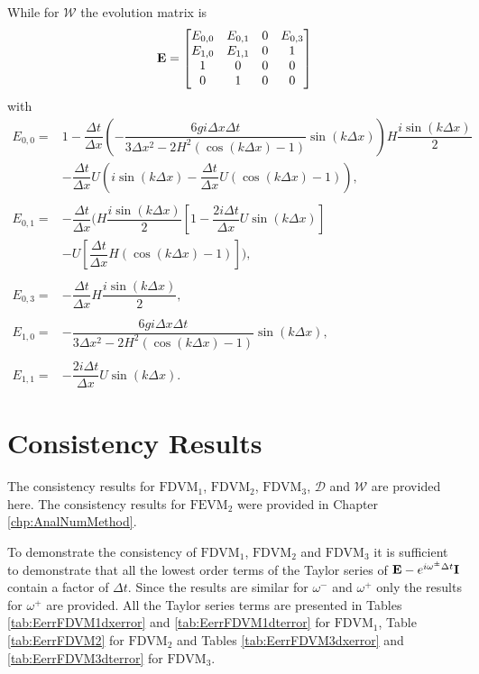 While for $\mathcal{W}$ the evolution matrix is 
\begin{equation}
\label{eqn:AppEvolW}
\mathbf{E} = \begin{bmatrix}
{E}_{0,0} & {E}_{0,1} & 0 & E_{0,3} \\
{E}_{1,0} & E_{1,1} &0 & 1 \\
1&0&0&0\\
0&1&0&0
\end{bmatrix}
\end{equation}
with
\begin{align*}
{E}_{0,0} = &1 - \dfrac{\Delta t}{\Delta x}\left(-\dfrac{6 gi \Delta x\Delta t}{3 \Delta x^2 -2{H^2} \left( \cos\left(k \Delta x\right) - 1 \right)}{ \sin\left(k \Delta x\right)}\right)H\dfrac{i\sin\left(k\Delta x\right)}{2} \\  & - \dfrac{\Delta t}{\Delta x}U\left(i\sin\left(k\Delta x\right) - \dfrac{\Delta t}{\Delta x}U\left(\cos\left(k\Delta x\right) - 1\right)\right), \\ \\
{E}_{0,1} = &- \dfrac{\Delta t}{\Delta x} \Bigg(H\dfrac{i\sin\left(k\Delta x\right)}{2}\left[ 1 -\dfrac{2i \Delta t }{\Delta x} U \sin\left(k \Delta x\right) \right] \\ & -U\left[\dfrac{\Delta t}{\Delta x}H\left(\cos\left(k\Delta x\right) - 1\right)\right] \Bigg),\\ \\
E_{0,3} = &- \dfrac{\Delta t}{\Delta x}H\dfrac{i\sin\left(k\Delta x\right)}{2},  \\ \\
 {E}_{1,0} = &-\dfrac{6 gi \Delta x\Delta t}{3 \Delta x^2 -2{H^2} \left( \cos\left(k \Delta x\right) - 1 \right)}{ \sin\left(k \Delta x\right)}, \\ \\
{E}_{1,1} = &-\dfrac{2i \Delta t }{\Delta x} U \sin\left(k \Delta x\right).
\end{align*}

\section{Consistency Results}
The consistency results for $\text{FDVM}_1$, $\text{FDVM}_2$, $\text{FDVM}_3$, $\mathcal{D}$ and $\mathcal{W}$ are provided here. The consistency results for $\text{FEVM}_2$ were provided in Chapter \ref{chp:AnalNumMethod}.   

To demonstrate the consistency of $\text{FDVM}_1$, $\text{FDVM}_2$ and $\text{FDVM}_3$ it is sufficient to demonstrate that all the lowest order terms of the Taylor series of $\mathbf{E}- e^{i\omega^\pm \Delta t } \mathbf{I}$ contain a factor of $\Delta t$. Since the results are similar for $\omega^-$ and $\omega^+$ only the results for $\omega^+$ are provided. All the Taylor series terms are presented in Tables \ref{tab:EerrFDVM1dxerror} and \ref{tab:EerrFDVM1dterror} for $\text{FDVM}_1$, Table \ref{tab:EerrFDVM2} for $\text{FDVM}_2$ and Tables \ref{tab:EerrFDVM3dxerror} and \ref{tab:EerrFDVM3dterror} for $\text{FDVM}_3$.

